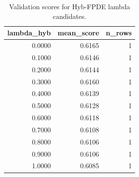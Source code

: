 \begin{table}[t]
\caption{Validation scores for Hyb-FPDE lambda candidates.}
\label{tab:lambda_distribution_computed}
\centering
\begin{tabular}{rrr}
\toprule
lambda\_hyb & mean\_score & n\_rows \\
\midrule
0.0000 & 0.6165 & 1 \\
0.1000 & 0.6146 & 1 \\
0.2000 & 0.6144 & 1 \\
0.3000 & 0.6160 & 1 \\
0.4000 & 0.6139 & 1 \\
0.5000 & 0.6128 & 1 \\
0.6000 & 0.6118 & 1 \\
0.7000 & 0.6108 & 1 \\
0.8000 & 0.6106 & 1 \\
0.9000 & 0.6106 & 1 \\
1.0000 & 0.6085 & 1 \\
\bottomrule
\end{tabular}

\end{table}
